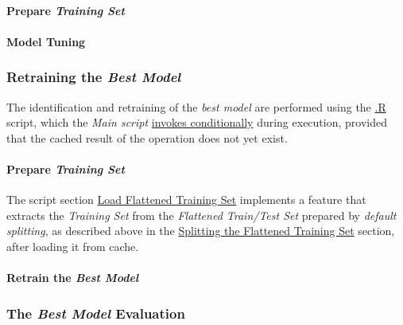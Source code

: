\documentclass[
]{report}
\begin{document}
\paragraph{\texorpdfstring{Prepare \emph{Training Set}}{Prepare Training Set}}\label{rf.train_set.tuning}

\hfill\break

\paragraph{Model Tuning}\label{rf.tuning}

\hfill\break

\subsubsection{\texorpdfstring{Retraining the \emph{Best Model}}{Retraining the Best Model}}\label{rf.retraining_best}

The identification and retraining of the \emph{best model} are performed using the \href{}{.R} script, which the \emph{Main script} \href{https://github.com/AzKurban-edX-DS/edx.capstone.choose-your-own/blob/main/r/index.R\#L}{invokes conditionally} during execution, provided that the cached result of the operation does not yet exist.

\paragraph{\texorpdfstring{Prepare \emph{Training Set}}{Prepare Training Set}}\label{rf.retrain.train_set}

\hfill\break

The script section \href{}{Load Flattened Training Set} implements a feature that extracts the \emph{Training Set} from the \emph{Flattened Train/Test Set} prepared by \emph{default splitting}, as described above in the \hyperref[splitting-the-flattened-training-set]{Splitting the Flattened Training Set} section, after loading it from cache.

\paragraph{\texorpdfstring{Retrain the \emph{Best Model}}{Retrain the Best Model}}\label{rf.best.retrain}

\hfill\break

\subsubsection{\texorpdfstring{The \emph{Best Model} Evaluation}{The Best Model Evaluation}}\label{rf.evaluation_best}
\end{document}
